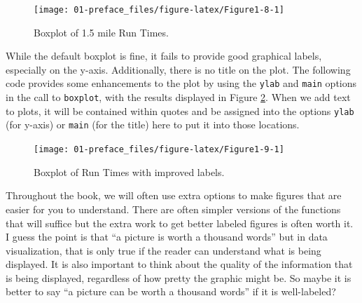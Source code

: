 \documentclass[
]{book}
\newenvironment{Shaded}{\begin{snugshade}}{\end{snugshade}}
\newcommand{\AttributeTok}[1]{\textcolor[rgb]{0.77,0.63,0.00}{#1}}
\newcommand{\FunctionTok}[1]{\textcolor[rgb]{0.00,0.00,0.00}{#1}}
\newcommand{\NormalTok}[1]{#1}
\newcommand{\SpecialCharTok}[1]{\textcolor[rgb]{0.00,0.00,0.00}{#1}}
\newcommand{\StringTok}[1]{\textcolor[rgb]{0.31,0.60,0.02}{#1}}
\begin{document}
\begin{figure}[ht!]

{\centering \texttt{[image: 01-preface\_files/figure-latex/Figure1-8-1]} 

}

\caption{Boxplot of 1.5 mile Run Times.}\label{fig:Figure1-8}
\end{figure}

\begin{Shaded}
\end{Shaded}

\indent While the default boxplot is fine, it fails to provide good graphical labels,
especially on the y-axis. Additionally, there is no title on the plot. The
following code provides some enhancements to the plot by using the \texttt{ylab} and
\texttt{main} options in the call to \texttt{boxplot}, with the results displayed in
Figure \ref{fig:Figure1-9}. When we add text to plots, it will be contained within quotes and
be assigned into the options \texttt{ylab} (for y-axis) or \texttt{main}
(for the title) here to put it into those locations.



\begin{figure}[ht!]

{\centering \texttt{[image: 01-preface\_files/figure-latex/Figure1-9-1]} 

}

\caption{Boxplot of Run Times with improved labels.}\label{fig:Figure1-9}
\end{figure}

\begin{Shaded}
\end{Shaded}

\indent Throughout the book, we will often use extra options to make figures that
are easier for you to understand. There
are often simpler versions of the functions that will suffice but the extra
work to get better labeled figures is often worth it. I guess the point is that
``a picture is worth a thousand words'' but in data visualization, that is only
true if the reader can understand what is being displayed. It is also important
to think about the quality of the information that is being displayed,
regardless of how pretty the graphic might be. So maybe it is better to say
``a picture can be worth a thousand words'' if it is well-labeled?
\end{document}
